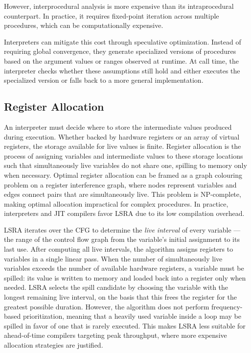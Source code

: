 However, interprocedural analysis is more expensive than its intraprocedural counterpart. In practice, it requires fixed-point iteration across multiple procedures, which can be computationally expensive.

Interpreters can mitigate this cost through speculative optimization. Instead of requiring global convergence, they generate specialized versions of procedures based on the argument values or ranges observed at runtime. At call time, the interpreter checks whether these assumptions still hold and either executes the specialized version or falls back to a more general implementation.

\subsection{Register Allocation}

An interpreter must decide where to store the intermediate values produced during execution. Whether backed by hardware registers or an array of virtual registers, the storage available for live values is finite. Register allocation is the process of assigning variables and intermediate values to these storage locations such that simultaneously live variables do not share one, spilling to memory only when necessary.
Optimal register allocation can be framed as a graph colouring problem on a register interference graph, where nodes represent variables and edges connect pairs that are simultaneously live. This problem is NP-complete, making optimal allocation impractical for complex procedures. In practice, interpreters and JIT compilers favor \acf{LSRA} due to its low compilation overhead.

\ac{LSRA} iterates over the \ac{CFG} to determine the \emph{live interval} of every variable --- the range of the control flow graph from the variable's initial assignment to its last use. After computing all live intervals, the algorithm assigns registers to variables in a single linear pass. When the number of simultaneously live variables exceeds the number of available hardware registers, a variable must be spilled: its value is written to memory and loaded back into a register only when needed. \ac{LSRA} selects the spill candidate by choosing the variable with the longest remaining live interval, on the basis that this frees the register for the greatest possible duration. However, the algorithm does not perform frequency-based prioritization, meaning that a heavily used variable inside a loop may be spilled in favor of one that is rarely executed. This makes \ac{LSRA} less suitable for ahead-of-time compilers targeting peak throughput, where more expensive allocation strategies are justified.

